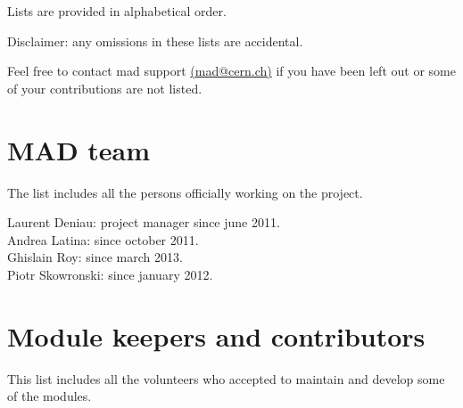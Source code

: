 


Lists are provided in alphabetical order.

Disclaimer: any omissions in these lists are accidental. 

Feel free to contact mad support
\href{mailto:mad.support@cern.ch}{(mad@cern.ch)} 
if you have been left out or some of your contributions are not listed. 

\section{MAD team}

The list includes all the persons officially working on the \madx project.

Laurent Deniau: project manager since june 2011.\\
Andrea Latina: since october 2011.\\
Ghislain Roy: since march 2013.\\
Piotr Skowronski: since january 2012.\\


\section{Module keepers and contributors}

This list includes all the volunteers who accepted to maintain and
develop some of the \madx modules.

